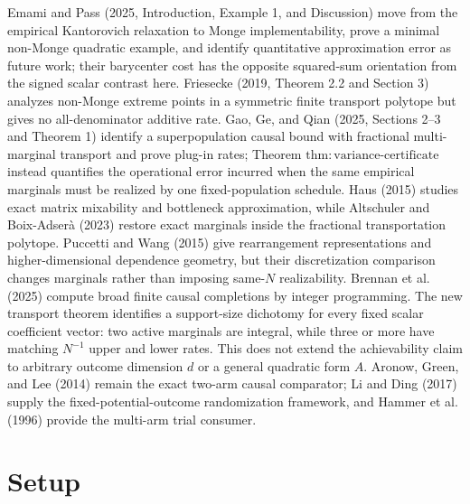 \documentclass{article}
\begin{document}
Emami and Pass (2025, Introduction, Example 1, and Discussion) move from the empirical Kantorovich relaxation to Monge implementability, prove a minimal non-Monge quadratic example, and identify quantitative approximation error as future work; their barycenter cost has the opposite squared-sum orientation from the signed scalar contrast here.  Friesecke (2019, Theorem 2.2 and Section 3) analyzes non-Monge extreme points in a symmetric finite transport polytope but gives no all-denominator additive rate.  Gao, Ge, and Qian (2025, Sections 2--3 and Theorem 1) identify a superpopulation causal bound with fractional multi-marginal transport and prove plug-in rates; Theorem \(\mathrm{thm{:}variance\mbox{-}certificate}\) instead quantifies the operational error incurred when the same empirical marginals must be realized by one fixed-population schedule.  Haus (2015) studies exact matrix mixability and bottleneck approximation, while Altschuler and Boix-Adser\`a (2023) restore exact marginals inside the fractional transportation polytope.  Puccetti and Wang (2015) give rearrangement representations and higher-dimensional dependence geometry, but their discretization comparison changes marginals rather than imposing same-\(N\) realizability.  Brennan et al. (2025) compute broad finite causal completions by integer programming.  The new transport theorem identifies a support-size dichotomy for every fixed scalar coefficient vector: two active marginals are integral, while three or more have matching \(N^{-1}\) upper and lower rates.  This does not extend the achievability claim to arbitrary outcome dimension \(d\) or a general quadratic form \(A\).  Aronow, Green, and Lee (2014) remain the exact two-arm causal comparator; Li and Ding (2017) supply the fixed-potential-outcome randomization framework, and Hammer et al. (1996) provide the multi-arm trial consumer.

\section{Setup}
\end{document}
